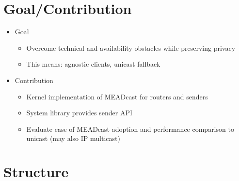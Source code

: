 \section{Goal/Contribution} %
\label{sec:Goal/Contribution}
\begin{itemize}\itemsep0em
    \item Goal
    \begin{itemize}\itemsep0em
        \item Overcome technical and availability obstacles while preserving privacy
        \item This means: agnostic clients, unicast fallback
    \end{itemize}
    \item Contribution
    \begin{itemize}
        \item Kernel implementation of MEADcast for routers and senders
        \item System library provides sender API
        \item Evaluate ease of MEADcast adoption and performance comparison to unicast (may also IP multicast)
    \end{itemize}
\end{itemize}


\section{Structure} %
\label{sec:Structure}

